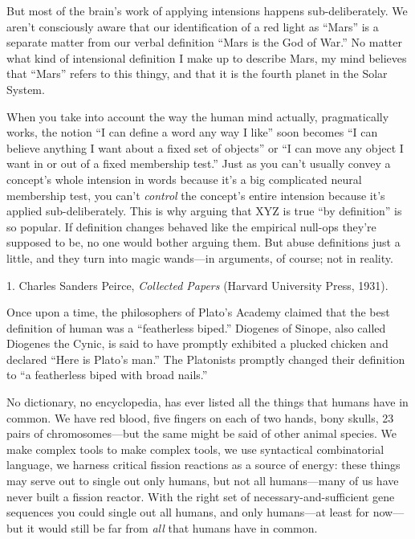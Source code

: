 {
 But most of the brain's work of applying
intensions happens sub-deliberately. We aren't
consciously aware that our identification of a red light as
``Mars'' is a separate matter from
our verbal definition ``Mars is the God of
War.'' No matter what kind of intensional definition
I make up to describe Mars, my mind believes that
``Mars'' refers to this thingy, and
that it is the fourth planet in the Solar System.}

{
 When you take into account the way the human mind actually,
pragmatically works, the notion ``I can define a word
any way I like'' soon becomes ``I
can believe anything I want about a fixed set of
objects'' or ``I can move any object
I want in or out of a fixed membership test.'' Just
as you can't usually convey a concept's
whole intension in words because it's a big complicated
neural membership test, you can't \textit{control} the
concept's entire intension because it's
applied sub-deliberately. This is why arguing that XYZ is true
``by definition'' is so popular. If
definition changes behaved like the empirical null-ops
they're supposed to be, no one would bother arguing
them. But abuse definitions just a little, and they turn into magic
wands---in arguments, of course; not in reality.}

\myendsectiontext


\bigskip

{
 1. Charles Sanders Peirce, \textit{Collected Papers} (Harvard
University Press, 1931).}


{
 Once upon a time, the philosophers of Plato's
Academy claimed that the best definition of human was a
``featherless biped.'' Diogenes of
Sinope, also called Diogenes the Cynic, is said to have promptly
exhibited a plucked chicken and declared ``Here is
Plato's man.'' The Platonists
promptly changed their definition to ``a featherless
biped with broad nails.'' }

{
 No dictionary, no encyclopedia, has ever listed all the things
that humans have in common. We have red blood, five fingers on each of
two hands, bony skulls, 23 pairs of chromosomes---but the same might be
said of other animal species. We make complex tools to make complex
tools, we use syntactical combinatorial language, we harness critical
fission reactions as a source of energy: these things may serve out to
single out only humans, but not all humans---many of us have never
built a fission reactor. With the right set of necessary-and-sufficient
gene sequences you could single out all humans, and only humans---at
least for now---but it would still be far from \textit{all} that humans
have in common.}


